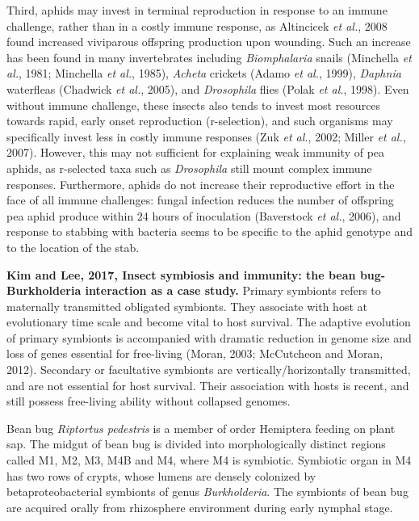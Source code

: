 \documentclass[11pt]{article}
\begin{document}
\begin{sloppypar}
Third, aphids may invest in terminal reproduction in response to an immune challenge, rather than in a costly immune response, as Altincicek \textit{et al.}, 2008 found increased viviparous offspring production upon wounding. 
Such an increase has been found in many invertebrates including \textit{Biomphalaria} snails (Minchella \textit{et al.}, 1981; Minchella \textit{et al.}, 1985), \textit{Acheta} crickets (Adamo \textit{et al.}, 1999), \textit{Daphnia} waterfleas (Chadwick \textit{et al.}, 2005), and \textit{Drosophila} flies (Polak \textit{et al.}, 1998). 
Even without immune challenge, these insects also tends to invest most resources towards rapid, early onset reproduction (r-selection), and such organisms may specifically invest less in costly immune responses (Zuk \textit{et al.}, 2002; Miller \textit{et al.}, 2007). 
However, this may not sufficient for explaining weak immunity of pea aphids, as r-selected taxa such as \textit{Drosophila} still mount complex immune responses. 
Furthermore, aphids do not increase their reproductive effort in the face of all immune challenges: 
fungal infection reduces the number of offspring pea aphid produce within 24 hours of inoculation (Baverstock \textit{et al.}, 2006), and response to stabbing with bacteria seems to be specific to the aphid genotype and to the location of the stab.
\par
\textbf{Kim and Lee, 2017, Insect symbiosis and immunity: the bean bug-Burkholderia interaction as a case study.} \newline
Primary symbionts refers to maternally transmitted obligated symbionts. 
They associate with host at evolutionary time scale and become vital to host survival. 
The adaptive evolution of primary symbionts is accompanied with dramatic reduction in genome size and loss of genes essential for free-living (Moran, 2003; McCutcheon and Moran, 2012). 
Secondary or facultative symbionts are vertically/horizontally transmitted, and are not essential for host survival. 
Their association with hosts is recent, and still possess free-living ability without collapsed genomes.
\par
Bean bug \textit{Riptortus pedestris} is a member of order Hemiptera feeding on plant sap. 
The midgut of bean bug is divided into morphologically distinct regions called M1, M2, M3, M4B and M4, where M4 is symbiotic. 
Symbiotic organ in M4 has two rows of crypts, whose lumens are densely colonized by betaproteobacterial symbionts of genus \textit{Burkholderia}. 
The symbionts of bean bug are acquired orally from rhizosphere environment during early nymphal stage. 

\end{sloppypar}
\end{document}
